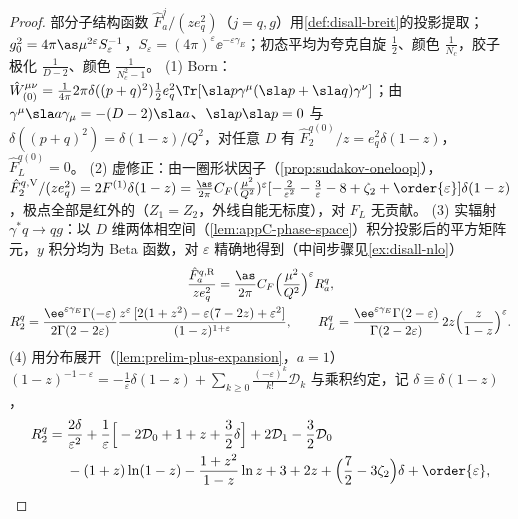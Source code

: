 \begin{proof}
部分子结构函数 $\hat F^j_a/(ze_q^2)$（$j=q,g$）用\cref{def:disall-breit}的投影提取；$g_0^2=4\pi\as\mu^{2\varepsilon}S_\varepsilon^{-1}$，$S_\varepsilon=(4\pi)^\varepsilon\ee^{-\varepsilon\gamma_E}$；初态平均为夸克自旋 $\frac12$、颜色 $\frac1{N_c}$，胶子极化 $\frac1{D-2}$、颜色 $\frac1{N_c^2-1}$。
(1) Born：$\hat W^{\mu\nu}_{(0)}=\frac1{4\pi}2\pi\delta((p+q)^2)\frac12e_q^2\Tr[\sla p\gamma^\mu(\sla p+\sla q)\gamma^\nu]$；由 $\gamma^\mu\sla a\gamma_\mu=-(D-2)\sla a$、$\sla p\sla p=0$ 与
$\delta((p+q)^2)=\delta(1-z)/Q^2$，对任意 $D$ 有 $\hat F^{q(0)}_2/z=e_q^2\delta(1-z)$，$\hat F^{q(0)}_L=0$。   %
(2) 虚修正：由一圈形状因子（\cref{prop:sudakov-oneloop}），$\hat F^{q,\mathrm V}_2/(ze_q^2)=2F^{(1)}\delta(1-z)=\frac{\as}{2\pi}C_F(\frac{\mu^2}{Q^2})^\varepsilon[-\frac2{\varepsilon^2}-\frac3\varepsilon-8+\zeta_2+\order{\varepsilon}]\delta(1-z)$，极点全部是红外的（$Z_1=Z_2$，外线自能无标度），对 $F_L$ 无贡献。   %
(3) 实辐射 $\gamma^*q\to qg$：以 $D$ 维两体相空间（\cref{lem:appC-phase-space}）积分投影后的平方矩阵元，$y$ 积分均为 Beta 函数，对 $\varepsilon$ 精确地得到（中间步骤见\cref{ex:disall-nlo}）
\begin{equation}\label{eq:disall-Rq}
\begin{gathered}
\frac{\hat F^{q,\mathrm R}_a}{ze_q^2}=\frac{\as}{2\pi}C_F\Big(\frac{\mu^2}{Q^2}\Big)^\varepsilon R^q_a,\\
R^q_2=\frac{\ee^{\varepsilon\gamma_E}\Gamma(-\varepsilon)}{2\Gamma(2-2\varepsilon)}\frac{z^\varepsilon\,[2(1+z^2)-\varepsilon(7-2z)+\varepsilon^2]}{(1-z)^{1+\varepsilon}},\qquad
R^q_L=\frac{\ee^{\varepsilon\gamma_E}\Gamma(2-\varepsilon)}{\Gamma(2-2\varepsilon)}\,2z\Big(\frac z{1-z}\Big)^\varepsilon .   %
\end{gathered}
\end{equation}
(4) 用分布展开（\cref{lem:prelim-plus-expansion}，$a=1$）$(1-z)^{-1-\varepsilon}=-\frac1\varepsilon\delta(1-z)+\sum_{k\ge0}\frac{(-\varepsilon)^k}{k!}\mathcal D_k$ 与乘积约定，记 $\delta\equiv\delta(1-z)$，
\begin{equation}\label{eq:disall-Rq-exp}
\begin{aligned}
R^q_2={}&\frac{2\delta}{\varepsilon^2}+\frac1\varepsilon\Big[-2\mathcal D_0+1+z+\frac32\delta\Big]+2\mathcal D_1-\frac32\mathcal D_0\\
&-(1+z)\ln(1-z)-\frac{1+z^2}{1-z}\ln z+3+2z+\Big(\frac72-3\zeta_2\Big)\delta+\order{\varepsilon},   %
\end{aligned}
\end{equation}

\end{proof}
